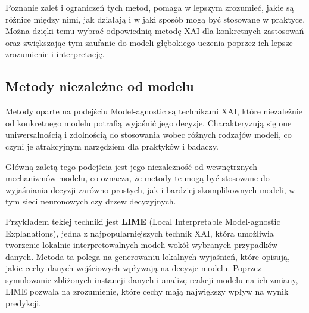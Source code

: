 Poznanie zalet i ograniczeń tych metod, pomaga w lepszym zrozumieć, jakie są różnice między nimi, jak działają i w jaki sposób mogą być stosowane w praktyce.
Można dzięki temu wybrać odpowiednią metodę XAI dla konkretnych zastosowań oraz zwiększając tym zaufanie do modeli głębokiego uczenia poprzez ich lepsze zrozumienie i interpretację.

\subsection*{Metody niezależne od modelu}
Metody oparte na podejściu Model-agnostic są technikami XAI, które niezależnie od konkretnego modelu potrafią wyjaśnić jego decyzje.
Charakteryzują się one uniwersalnością i zdolnością do stosowania wobec różnych rodzajów modeli, co czyni je atrakcyjnym narzędziem dla praktyków i badaczy.

Główną zaletą tego podejścia jest jego niezależność od wewnętrznych mechanizmów modelu, co oznacza, że metody te mogą być stosowane do wyjaśniania decyzji zarówno prostych, jak i bardziej skomplikownych modeli, w tym sieci neuronowych czy drzew decyzyjnych.

Przykładem tekiej techniki jest \textbf{LIME} (Local Interpretable Model-agnostic Explanations)\cite{ribeiro2016why, LIMEwhy}, jedna z najpopularniejszych technik XAI, która umożliwia tworzenie lokalnie interpretowalnych modeli wokół wybranych przypadków danych.
Metoda ta polega na generowaniu lokalnych wyjaśnień, które opisują, jakie cechy danych wejściowych wpływają na decyzje modelu.
Poprzez symulowanie zbliżonych instancji danych i analizę reakcji modelu na ich zmiany, LIME pozwala na zrozumienie, które cechy mają największy wpływ na wynik predykcji.

